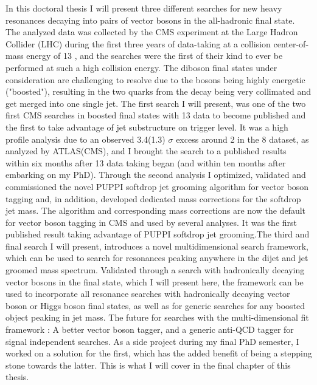 \small
\noindent In this doctoral thesis I will present three different searches for new heavy resonances decaying into pairs of vector bosons in the all-hadronic final state. The analyzed data was collected by the CMS experiment at the Large Hadron Collider (LHC) during the first three years of data-taking at a collision center-of-mass energy of 13 \TeV, and the searches were the first of their kind to ever be performed at such a high collision energy. The diboson final states under consideration are challenging to resolve due to the bosons being highly energetic ("boosted"), resulting in the two quarks from the decay being very collimated and get merged into one single jet.
\newline
The first search I will present, was one of the two first CMS searches in boosted final states with 13 \TeV data to become published and the first to take advantage of jet substructure on trigger level. It was a high profile analysis due to an observed 3.4(1.3) $\sigma$ excess around 2 \TeV in the 8 \TeV dataset, as analyzed by ATLAS(CMS), and I brought the search to a published results within six months after 13 \TeV data taking began (and within ten months after embarking on my PhD). Through the second analysis I optimized, validated and commissioned the novel PUPPI softdrop jet grooming algorithm for vector boson tagging and, in addition, developed dedicated mass corrections for the softdrop jet mass. The algorithm and corresponding mass corrections are now the default for vector boson tagging in CMS and used by several analyses. It was the first published result taking advantage of PUPPI softdrop jet grooming.The third and final search I will present, introduces a novel multidimensional search framework, which can be used to search for resonances peaking anywhere in the dijet and jet groomed mass spectrum. Validated through a search with hadronically decaying vector bosons in the final state, which I will present here, the framework can be used to incorporate all resonance searches with hadronically decaying vector boson or Higgs boson final states, as well as for generic searches for any boosted object peaking in jet mass.
\newline
\newline
The future for searches with the multi-dimensional fit framework : A better vector boson tagger, and a generic anti-QCD tagger for signal independent searches. As a side project during my final PhD semester, I worked on a solution for the first, which has the added benefit of being a stepping stone towards the latter. This is what I will cover in the final chapter of this thesis.